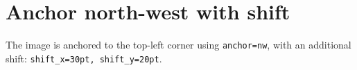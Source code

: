 \documentclass{article}
\begin{document}
\section*{Anchor north-west with shift}

The image is anchored to the top-left corner using \texttt{anchor=nw},
with an additional shift: \texttt{shift\_x=30pt, shift\_y=20pt}.

\lipsum[1-5]
\end{document}
